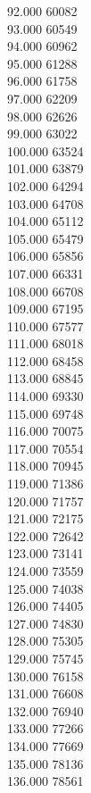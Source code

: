 { 92.000	60082 \\
 93.000	60549 \\
 94.000	60962 \\
 95.000	61288 \\
 96.000	61758 \\
 97.000	62209 \\
 98.000	62626 \\
 99.000	63022 \\
 100.000	63524 \\
 101.000	63879 \\
 102.000	64294 \\
 103.000	64708 \\
 104.000	65112 \\
 105.000	65479 \\
 106.000	65856 \\
 107.000	66331 \\
 108.000	66708 \\
 109.000	67195 \\
 110.000	67577 \\
 111.000	68018 \\
 112.000	68458 \\
 113.000	68845 \\
 114.000	69330 \\
 115.000	69748 \\
 116.000	70075 \\
 117.000	70554 \\
 118.000	70945 \\
 119.000	71386 \\
 120.000	71757 \\
 121.000	72175 \\
 122.000	72642 \\
 123.000	73141 \\
 124.000	73559 \\
 125.000	74038 \\
 126.000	74405 \\
 127.000	74830 \\
 128.000	75305 \\
 129.000	75745 \\
 130.000	76158 \\
 131.000	76608 \\
 132.000	76940 \\
 133.000	77266 \\
 134.000	77669 \\
 135.000	78136 \\
 136.000	78561 \\
}
